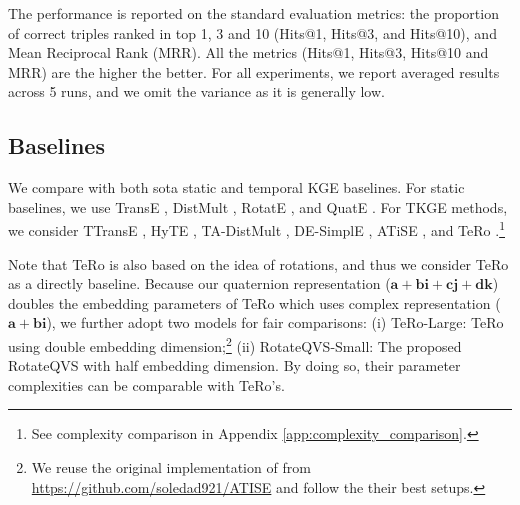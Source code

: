 \documentclass[11pt]{article}
\newcommand{\vect}[1]{\mathbf{#1}\xspace}
\newcommand{\vecti}{\vect{i}\xspace}
\newcommand{\vectj}{\vect{j}\xspace}
\newcommand{\vectk}{\vect{k}\xspace}
\begin{document}
The performance is reported on the standard evaluation metrics: the proportion of correct triples ranked in top 1, 3 and 10 (Hits@1, Hits@3, and Hits@10), and Mean Reciprocal Rank (MRR).
All the metrics (Hits@1, Hits@3, Hits@10 and MRR) are the higher the better.
For all experiments, we report averaged results across 5 runs, and we omit the variance as it is generally low.



\subsection{Baselines}
\label{sec:Baselines}
We compare with both sota static and temporal KGE baselines.
For static baselines, we use TransE \cite{bordes2013translating}, DistMult \cite{Yang2015EmbeddingEA}, RotatE \cite{SunDNT19}, and QuatE \cite{zhang2019quaternion}.
For TKGE methods, we consider TTransE \cite{leblay2018deriving}, HyTE \cite{dasgupta2018hyte}, TA-DistMult \cite{garcia2018learning}, DE-SimplE \cite{goel2020diachronic}, ATiSE \cite{xu2019temporal}, and TeRo \cite{xu2020tero}.\footnote{See complexity comparison in Appendix \ref{app:complexity_comparison}.}


Note that TeRo \cite{xu2020tero} is also based on the idea of rotations, and thus we consider TeRo as a directly baseline.
Because our quaternion representation ($\vect{a} + \vect{b} \vecti +\vect{c} \vectj +\vect{d} \vectk$) doubles the embedding parameters of TeRo which uses complex representation ($\vect{a} + \vect{b} \vecti$),  we further adopt two models for fair comparisons:
(i) TeRo-Large: TeRo using double embedding dimension;\footnote{We reuse the original implementation of \cite{xu2020tero} from \url{https://github.com/soledad921/ATISE} and follow the their best setups.}
(ii) RotateQVS-Small: The proposed RotateQVS with half embedding dimension.
By doing so, their parameter complexities can be comparable with TeRo's.
\end{document}
